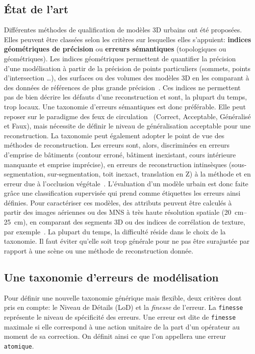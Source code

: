     \subsection*{\'Etat de l'art}
            Différentes méthodes de qualification de modèles 3D urbains ont été proposées.
            Elles peuvent être classées selon les critères sur lesquelles elles s'appuient: \textbf{indices géométriques de précision} ou \textbf{erreurs sémantiques} (topologiques ou géométriques).
            Les indices géométriques permettent de quantifier la précision d'une modélisation à partir de la précision de points particuliers (sommets, points d'intersection \dots), des surfaces ou des volumes des modèles 3D en les comparant à des données de références de plus grande précision~\parencite{zeng2014multicriteria}.
            Ces indices ne permettent pas de bien décrire les défauts d'une reconstruction et sont, la plupart du temps, trop locaux.
            Une taxonomie d'erreurs sémantiques est donc préférable.
            Elle peut reposer sur le paradigme des feux de circulation~\parencite{boudet2006supervised} (Correct, Acceptable, Généralisé et Faux), mais nécessite de définir le niveau de généralisation acceptable pour une reconstruction.
            La taxonomie peut également adopter le point de vue des méthodes de reconstruction. 
            Les erreurs sont, alors, discriminées en erreurs d'emprise de bâtiments (contour erroné, bâtiment inexistant, cours intérieure manquante et emprise imprécise), en erreurs de reconstruction intinsèques (sous-segmentation, sur-segmentation, toit inexact, translation en Z) à la méthode et en erreur due à l'occlusion végétale~\parencite{michelin2013quality}.
            L'évaluation d'un modèle urbain est donc faite grâce une classification supervisée qui prend comme étiquettes les erreurs ainsi définies.
            Pour caractériser ces modèles, des attributs peuvent être calculés à partir des images aériennes ou des MNS à très haute résolution spatiale (\SIrange[locale=FR]{20}{25}{\cm}), en comparant des segments 3D ou des indices de corrélation de texture, par exemple~\parencite{boudet2006supervised, michelin2013quality}.
            La plupart du temps, la difficulté réside dans le choix de la taxonomie.
            Il faut éviter qu'elle soit trop générale pour ne pas être surajustée par rapport à une scène ou une méthode de reconstruction donnée.

    \subsection*{Une taxonomie d'erreurs de modélisation}
        Pour définir une nouvelle taxonomie générique mais flexible, deux critères dont pris en compte: le Niveau de Détails (LoD) et la \textit{finesse} de l'erreur.
        La \texttt{finesse} représente le niveau de spécificité des erreurs.
        Une erreur est dite de \texttt{finesse} maximale si elle correspond à une action unitaire de la part d'un opérateur au moment de sa correction.
        On définit ainsi ce que l'on appellera une erreur \texttt{atomique}.\\

